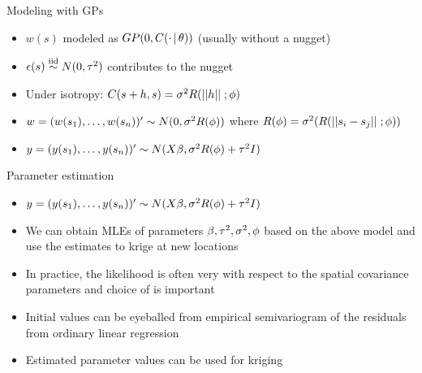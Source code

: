 \begin{frame}{Modeling with GPs}
	\begin{itemize}
		\item $w(s)$ modeled as $GP(0,C(\cdot\,|\, \theta))$ (usually without a nugget)
		\item $\epsilon(s) \stackrel{\mathrm{iid}}{\sim} N(0,\tau^2)$ contributes to the nugget
		\item Under isotropy: $C(s+h,s) = \sigma^2 R(||h|| \; ; \phi )$
		\item $w = (w(s_1),\ldots,w(s_n))' \sim N(0, \sigma^2 R(\phi))$ where $R(\phi) = \sigma^2 (R(||s_i-s_j|| \; ; \phi))$
		\item $y=(y(s_1),\ldots,y(s_n))' \sim N(X\beta,\sigma^2 R(\phi) + \tau^2 I)$
	\end{itemize}
\end{frame}

\begin{frame}{Parameter estimation}
\begin{itemize}
	\item $y=(y(s_1),\ldots,y(s_n))' \sim N(X\beta,\sigma^2 R(\phi) + \tau^2 I)$
	\item We can obtain MLEs of parameters $\beta, \tau^2, \sigma^2, \phi$ based on the above model and use the estimates to krige at new locations
	\item In practice, the likelihood is often very  with respect to the spatial covariance parameters and choice of  is important
	\item Initial values can be eyeballed from empirical semivariogram of the residuals from ordinary linear regression
	\item Estimated parameter values can be used for kriging
\end{itemize}
\end{frame}


